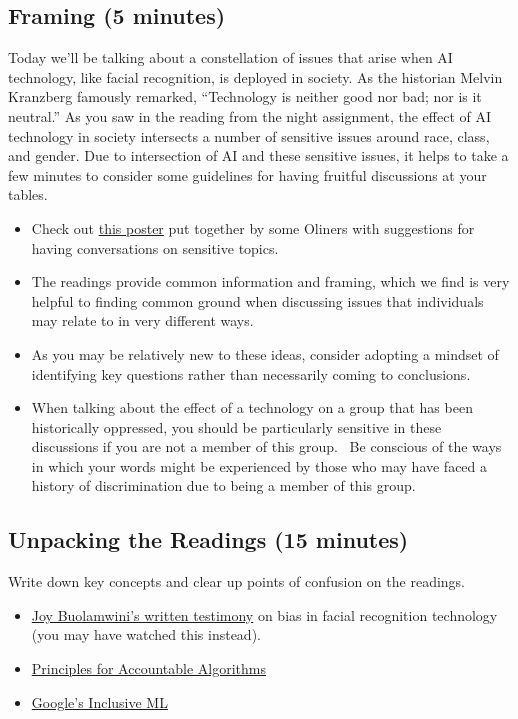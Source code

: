 \subsection{Framing (5 minutes)}

Today we'll be talking about a constellation of issues that arise when AI technology, like facial recognition, is deployed in society.  As the historian Melvin Kranzberg famously remarked, ``Technology is neither good nor bad; nor is it neutral.''  As you saw in the reading from the night assignment, the effect of AI technology in society intersects a number of sensitive issues around race, class, and gender.  Due to intersection of AI and these sensitive issues, it helps to take a few minutes to consider some guidelines for having fruitful discussions at your tables.

\begin{itemize}
\item Check out \href{https://drive.google.com/file/d/1RZ9VHbWvsJwDbyF6zrmkd5mUdINrzt_f/view}{this poster} put together by some Oliners with suggestions for having conversations on sensitive topics.
\item The readings provide common information and framing, which we find is very helpful to finding common ground when discussing issues that individuals may relate to in very different ways.
\item As you may be relatively new to these ideas, consider adopting a mindset of identifying key questions rather than necessarily coming to conclusions.
\item When talking about the effect of a technology on a group that has been historically oppressed, you should be particularly sensitive in these discussions if you are not a member of this group.  Be conscious of the ways in which your words might be experienced by those who may have faced a history of discrimination due to being a member of this group.
\end{itemize}

\subsection{Unpacking the Readings (15 minutes)}
Write down key concepts and clear up points of confusion on the readings.

\begin{itemize}
\item \href{https://docs.house.gov/meetings/GO/GO00/20190522/109521/HHRG-116-GO00-Wstate-BuolamwiniJ-20190522.pdf}{Joy Buolamwini's written testimony} on bias in facial recognition technology (you may have watched this instead).
\item \href{https://www.fatml.org/resources/principles-for-accountable-algorithms}{Principles for Accountable Algorithms}
\item \href{https://cloud.google.com/inclusive-ml/}{Google's Inclusive ML}
\end{itemize}

